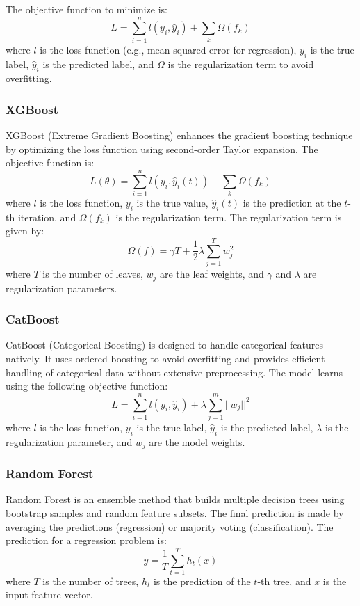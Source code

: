The objective function to minimize is:
\begin{equation*}
L = \sum_{i=1}^{n} l(y_i, \hat{y}_i) + \sum_{k} \Omega(f_k)
\end{equation*}
where $l$ is the loss function (e.g., mean squared error for regression), $y_i$ is the true label, $\hat{y}_i$ is the predicted label, and $\Omega$ is the regularization term to avoid overfitting.

\subsubsection{XGBoost}
XGBoost (Extreme Gradient Boosting) enhances the gradient boosting technique by optimizing the loss function using second-order Taylor expansion. The objective function is:
\begin{equation*}
L(\theta) = \sum_{i=1}^{n} l(y_i, \hat{y}_i(t)) + \sum_{k} \Omega(f_k)
\end{equation*}
where $l$ is the loss function, $y_i$ is the true value, $\hat{y}_i(t)$ is the prediction at the $t$-th iteration, and $\Omega(f_k)$ is the regularization term. The regularization term is given by:
\begin{equation*}
\Omega(f) = \gamma T + \frac{1}{2} \lambda \sum_{j=1}^{T} w_j^2
\end{equation*}
where $T$ is the number of leaves, $w_j$ are the leaf weights, and $\gamma$ and $\lambda$ are regularization parameters.

\subsubsection{CatBoost}
CatBoost (Categorical Boosting) is designed to handle categorical features natively. It uses ordered boosting to avoid overfitting and provides efficient handling of categorical data without extensive preprocessing. The model learns using the following objective function:
\begin{equation*}
L = \sum_{i=1}^{n} l(y_i, \hat{y}_i) + \lambda \sum_{j=1}^{m} ||w_j||^2
\end{equation*}
where $l$ is the loss function, $y_i$ is the true label, $\hat{y}_i$ is the predicted label, $\lambda$ is the regularization parameter, and $w_j$ are the model weights.

\subsubsection{Random Forest}
Random Forest is an ensemble method that builds multiple decision trees using bootstrap samples and random feature subsets. The final prediction is made by averaging the predictions (regression) or majority voting (classification). The prediction for a regression problem is:
\begin{equation*}
\hat{y} = \frac{1}{T} \sum_{t=1}^{T} h_t(x)
\end{equation*}
where $T$ is the number of trees, $h_t$ is the prediction of the $t$-th tree, and $x$ is the input feature vector.


